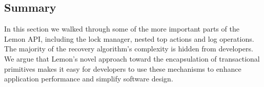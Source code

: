 \documentclass[10pt,letterpaper,twocolumn,english]{article}
\newcommand{\yad}{Lemon\xspace}
\newcommand{\eab}[1]{\textcolor{red}{\bf EAB: #1}}
\begin{document}




\subsection{Summary}

In this section we walked through some of the more important parts of
the \yad API, including the lock manager, nested top actions and log
operations.  The majority of the recovery algorithm's complexity is 
hidden from developers.  We argue that \yad's novel approach toward 
the encapsulation of transactional primitives makes it easy for 
developers to use these mechanisms to enhance application performance
and simplify software design.








\end{document}
